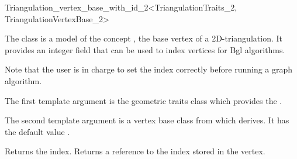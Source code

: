

\begin{ccRefClass}{Triangulation_vertex_base_with_id_2<TriangulationTraits_2, TriangulationVertexBase_2>}

\ccDefinition

The class  is a model of the concept
, the base vertex of a 2D-triangulation.
It provides an integer field that can be used to index vertices for {\sc Bgl}
algorithms.

Note that the user is in charge to set the index correctly before
running a graph algorithm.


\ccParameters

The first template argument is the geometric traits class
 which provides the .

The second template argument is a vertex base class from which
 derives.  It has the default
value .

\ccIsModel {}

\ccInheritsFrom {}


\ccAccessFunctions
{}
\ccTagFullDeclarations

{Returns the index.}
\ccGlue
{}
{Returns a reference to the index stored in the vertex.}

\ccSeeAlso


\end{ccRefClass}
